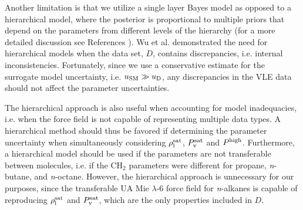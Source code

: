 \documentclass[preprint,letterpaper,floatfix,citeautoscript,aip,jcp]{revtex4-1}
\begin{document}
Another limitation is that we utilize a single layer Bayes model as opposed to a hierarchical model, where the posterior is proportional to multiple priors that depend on the parameters from different levels of the hierarchy (for a more detailed discussion see References ). Wu et al. demonstrated the need for hierarchical models when the data set, $D$, contains discrepancies, i.e. internal inconsistencies. 
Fortunately, since we use a conservative estimate for the surrogate model uncertainty, i.e. $u_{\rm SM} \gg u_{\rm D}$, any discrepancies in the VLE data should not affect the parameter uncertainties. 

The hierarchical approach is also useful when accounting for model inadequacies, i.e. when the force field is not capable of representing multiple data types. A hierarchical method should thus be favored if determining the parameter uncertainty when simultaneously considering $\rho_{\rm l}^{\rm sat}$, $P_{\rm v}^{\rm sat}$ and $P^{\rm high}$. Furthermore, a hierarchical model should be used if the parameters are not transferable between molecules, i.e. if the CH$_2$ parameters were different for propane, \textit{n}-butane, and \textit{n}-octane. However, the hierarchical approach is unnecessary for our purposes, since the transferable UA Mie $\lambda$-6 force field for \textit{n}-alkanes is capable of reproducing $\rho_{\rm l}^{\rm sat}$ and $P_{\rm v}^{\rm sat}$, which are the only properties included in $D$. 



\end{document}
